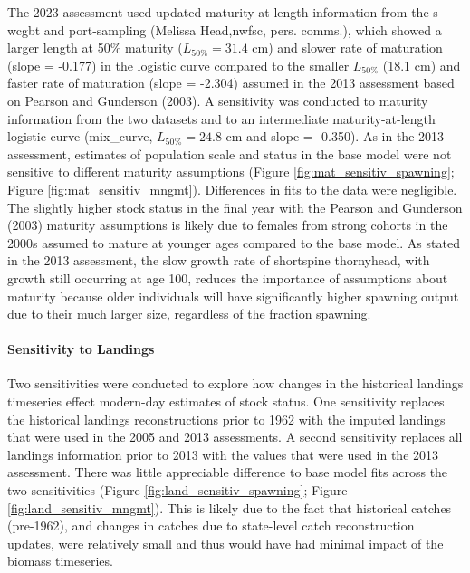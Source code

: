 \documentclass[11pt,
  english,
  letterpaper,
]{article}
\begin{document}
The 2023 assessment used updated maturity-at-length information from the \gls{s-wcgbt} and port-sampling (Melissa Head,\gls{nwfsc}, pers. comms.), which showed a larger length at 50\% maturity (\(L_{50\%} = 31.4\) cm) and slower rate of maturation (slope = -0.177) in the logistic curve compared to the smaller \(L_{50\%}\) (18.1 cm) and faster rate of maturation (slope = -2.304) assumed in the 2013 assessment based on Pearson and Gunderson (2003). A sensitivity was conducted to maturity information from the two datasets and to an intermediate maturity-at-length logistic curve (mix\_curve, \(L_{50\%} = 24.8\) cm and slope = -0.350). As in the 2013 assessment, estimates of population scale and status in the base model were not sensitive to different maturity assumptions (Figure \ref{fig:mat_sensitiv_spawning}; Figure \ref{fig:mat_sensitiv_mngmt}). Differences in fits to the data were negligible. The slightly higher stock status in the final year with the Pearson and Gunderson (2003) maturity assumptions is likely due to females from strong cohorts in the 2000s assumed to mature at younger ages compared to the base model. As stated in the 2013 assessment, the slow growth rate of shortspine thornyhead, with growth still occurring at age 100, reduces the importance of assumptions about maturity because older individuals will have significantly higher spawning output due to their much larger size, regardless of the fraction spawning.

\hypertarget{sensitivity-to-landings}{%
\paragraph{Sensitivity to Landings}\label{sensitivity-to-landings}}

Two sensitivities were conducted to explore how changes in the historical landings timeseries effect modern-day estimates of stock status. One sensitivity replaces the historical landings reconstructions prior to 1962 with the imputed landings that were used in the 2005 and 2013 assessments. A second sensitivity replaces all landings information prior to 2013 with the values that were used in the 2013 assessment. There was little appreciable difference to base model fits across the two sensitivities (Figure \ref{fig:land_sensitiv_spawning}; Figure \ref{fig:land_sensitiv_mngmt}). This is likely due to the fact that historical catches (pre-1962), and changes in catches due to state-level catch reconstruction updates, were relatively small and thus would have had minimal impact of the biomass timeseries.
\end{document}
